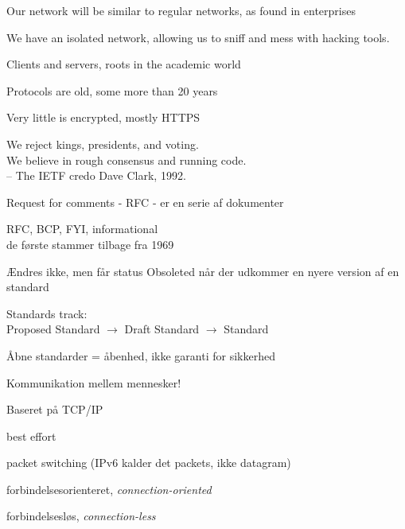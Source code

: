 \documentclass[Screen16to9,17pt]{foils}
\begin{document}


\begin{list1}
\item Our network will be similar to regular networks, as found in enterprises
\item We have an isolated network, allowing us to sniff and mess with hacking tools.
\end{list1}




\begin{list1}
\item Clients and servers, roots in the academic world
\item Protocols are old, some more than 20 years
\item Very little is encrypted, mostly HTTPS
\end{list1}


{\hlkbig \color{titlecolor}
We reject kings, presidents, and voting.\\
We believe in rough consensus and running code.\\
-- The IETF credo Dave Clark, 1992.}

\begin{list1}
\item Request for comments - RFC - er en serie af dokumenter
\item RFC, BCP, FYI, informational\\
de første stammer tilbage fra 1969
\item Ændres ikke, men får status Obsoleted når der udkommer en nyere
  version af en standard
\item Standards track:\\
Proposed Standard $\rightarrow$ Draft Standard $\rightarrow$ Standard
\item  Åbne standarder = åbenhed, ikke garanti for sikkerhed
\end{list1}


\begin{list1}
\item Kommunikation mellem mennesker!
\item Baseret på TCP/IP
\begin{list2}
\item best effort
\item packet switching (IPv6 kalder det packets, ikke datagram)
\item forbindelsesorienteret, \emph{connection-oriented}
\item forbindelsesløs, \emph{connection-less}
\end{list2}
\end{list1}
\end{document}
